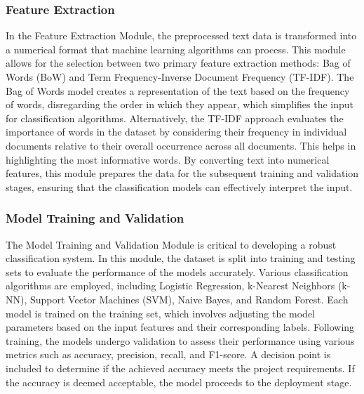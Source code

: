 \subsubsection{Feature Extraction}
\noindent
In the Feature Extraction Module, the preprocessed text data is transformed into a numerical format that machine learning algorithms can process. This module allows for the selection between two primary feature extraction methods: Bag of Words (BoW) and Term Frequency-Inverse Document Frequency (TF-IDF). The Bag of Words model creates a representation of the text based on the frequency of words, disregarding the order in which they appear, which simplifies the input for classification algorithms. Alternatively, the TF-IDF approach evaluates the importance of words in the dataset by considering their frequency in individual documents relative to their overall occurrence across all documents. This helps in highlighting the most informative words. By converting text into numerical features, this module prepares the data for the subsequent training and validation stages, ensuring that the classification models can effectively interpret the input.

\subsubsection{Model Training and Validation}
\noindent
The Model Training and Validation Module is critical to developing a robust classification system. In this module, the dataset is split into training and testing sets to evaluate the performance of the models accurately. Various classification algorithms are employed, including Logistic Regression, k-Nearest Neighbors (k-NN), Support Vector Machines (SVM), Naive Bayes, and Random Forest. Each model is trained on the training set, which involves adjusting the model parameters based on the input features and their corresponding labels. Following training, the models undergo validation to assess their performance using various metrics such as accuracy, precision, recall, and F1-score. A decision point is included to determine if the achieved accuracy meets the project requirements. If the accuracy is deemed acceptable, the model proceeds to the deployment stage. 

